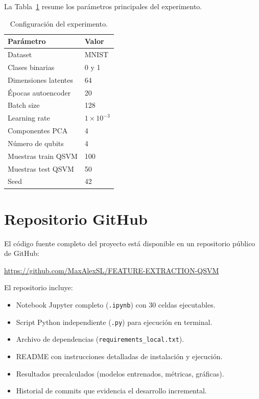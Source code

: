 \documentclass[conference]{IEEEtran}
\begin{document}
La Tabla~\ref{tab:config} resume los parámetros principales del experimento.

\begin{table}[H]
    \centering
    \caption{Configuración del experimento.}
    \label{tab:config}
    \begin{tabular}{ll}
        \toprule
        \textbf{Parámetro} & \textbf{Valor} \\
        \midrule
        Dataset & MNIST \\
        Clases binarias & 0 y 1 \\
        Dimensiones latentes & 64 \\
        Épocas autoencoder & 20 \\
        Batch size & 128 \\
        Learning rate & $1 \times 10^{-3}$ \\
        Componentes PCA & 4 \\
        Número de qubits & 4 \\
        Muestras train QSVM & 100 \\
        Muestras test QSVM & 50 \\
        Seed & 42 \\
        \bottomrule
    \end{tabular}
\end{table}

\section{Repositorio GitHub}
\label{sec:repositorio}

El código fuente completo del proyecto está disponible en un repositorio 
público de GitHub:

\begin{center}
    \url{https://github.com/MaxAlexSL/FEATURE-EXTRACTION-QSVM}
\end{center}

El repositorio incluye:
\begin{itemize}
    \item Notebook Jupyter completo (\texttt{.ipynb}) con 30 celdas ejecutables.
    \item Script Python independiente (\texttt{.py}) para ejecución en terminal.
    \item Archivo de dependencias (\texttt{requirements\_local.txt}).
    \item README con instrucciones detalladas de instalación y ejecución.
    \item Resultados precalculados (modelos entrenados, métricas, gráficas).
    \item Historial de commits que evidencia el desarrollo incremental.
\end{itemize}
\end{document}
